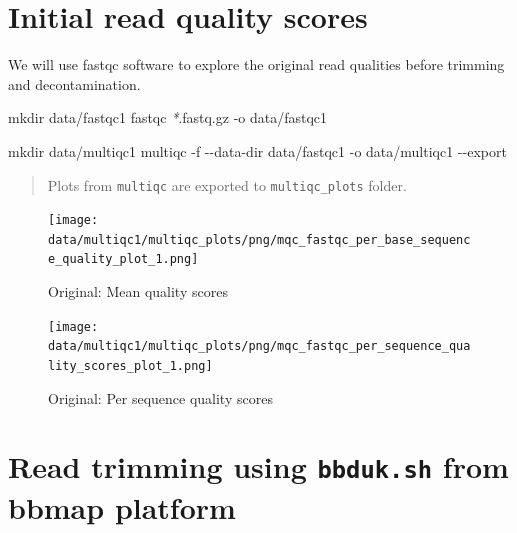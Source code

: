 \documentclass[
  12pt,
  openany]{book}
\newenvironment{Shaded}{\begin{snugshade}}{\end{snugshade}}
\newcommand{\AttributeTok}[1]{\textcolor[rgb]{0.77,0.63,0.00}{#1}}
\newcommand{\ExtensionTok}[1]{#1}
\newcommand{\FunctionTok}[1]{\textcolor[rgb]{0.00,0.00,0.00}{#1}}
\newcommand{\NormalTok}[1]{#1}
\newcommand{\PreprocessorTok}[1]{\textcolor[rgb]{0.56,0.35,0.01}{\textit{#1}}}
\begin{document}
\hypertarget{initial-read-quality-scores}{%
\section{Initial read quality scores}\label{initial-read-quality-scores}}

We will use fastqc software to explore the original read qualities before trimming and decontamination.

\begin{Shaded}
\begin{Highlighting}[]
\FunctionTok{mkdir}\NormalTok{ data/fastqc1}
\ExtensionTok{fastqc} \PreprocessorTok{*}\NormalTok{.fastq.gz }\AttributeTok{{-}o}\NormalTok{ data/fastqc1}
\end{Highlighting}
\end{Shaded}

\begin{Shaded}
\begin{Highlighting}[]
\FunctionTok{mkdir}\NormalTok{ data/multiqc1}
\ExtensionTok{multiqc} \AttributeTok{{-}f} \AttributeTok{{-}{-}data{-}dir}\NormalTok{ data/fastqc1 }\AttributeTok{{-}o}\NormalTok{ data/multiqc1 }\AttributeTok{{-}{-}export}
\end{Highlighting}
\end{Shaded}

\begin{quote}
Plots from \texttt{multiqc} are exported to \texttt{multiqc\_plots} folder.
\end{quote}

\begin{figure}
\centering
\texttt{[image: data/multiqc1/multiqc\_plots/png/mqc\_fastqc\_per\_base\_sequence\_quality\_plot\_1.png]}
\caption{Original: Mean quality scores}
\end{figure}

\begin{figure}
\centering
\texttt{[image: data/multiqc1/multiqc\_plots/png/mqc\_fastqc\_per\_sequence\_quality\_scores\_plot\_1.png]}
\caption{Original: Per sequence quality scores}
\end{figure}

\hypertarget{read-trimming-using-bbduk.sh-from-bbmap-platform}{%
\section{\texorpdfstring{Read trimming using \texttt{bbduk.sh} from bbmap platform}{Read trimming using bbduk.sh from bbmap platform}}\label{read-trimming-using-bbduk.sh-from-bbmap-platform}}
\end{document}
